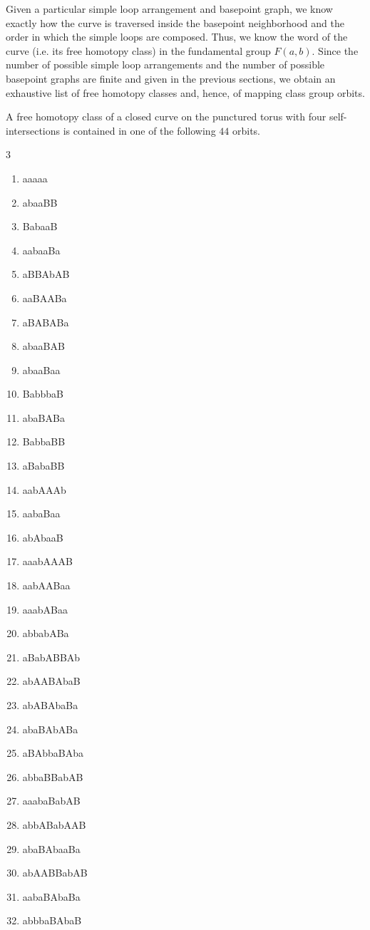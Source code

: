 \documentclass[11pt]{article}
\begin{document}
Given a particular simple loop arrangement and basepoint graph, we know exactly how the curve is traversed inside the basepoint neighborhood and the order in which the simple loops are composed. Thus, we know the word of the curve (i.e. its free homotopy class) in the fundamental group $F(a,b)$. Since the number of possible simple loop arrangements and the number of possible basepoint graphs are finite and given in the previous sections, we obtain an exhaustive list of free homotopy classes and, hence, of mapping class group orbits.

\begin{prop}
A free homotopy class of a closed curve on the punctured torus with four self-intersections is contained in one of the following $44$ orbits.
\begin{multicols}{3}
\begin{enumerate}
\item aaaaa
\item abaaBB
\item BabaaB
\item aabaaBa
\item aBBAbAB
\item aaBAABa
\item aBABABa
\item abaaBAB
\item abaaBaa
\item BabbbaB
\item abaBABa
\item BabbaBB
\item aBabaBB
\item aabAAAb
\item aabaBaa
\item abAbaaB
\item aaabAAAB
\item aabAABaa
\item aaabABaa
\item abbabABa
\item aBabABBAb
\item abAABAbaB
\item abABAbaBa
\item abaBAbABa
\item aBAbbaBAba
\item abbaBBabAB
\item aaabaBabAB
\item abbABabAAB
\item abaBAbaaBa
\item abAABBabAB
\item aabaBAbaBa
\item abbbaBAbaB

\end{enumerate}
\end{multicols}
\end{prop}
\end{document}
